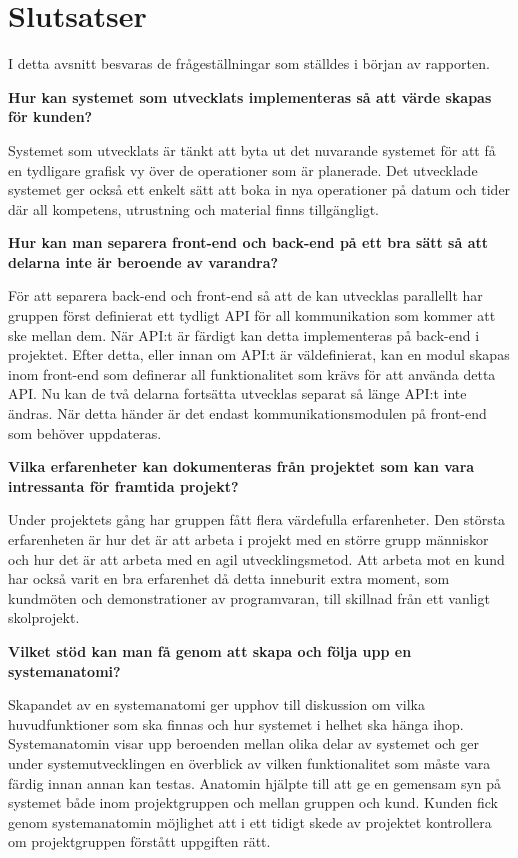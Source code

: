 \chapter{Slutsatser}
I detta avsnitt besvaras de frågeställningar som ställdes i början av rapporten.

\textbf{Hur kan systemet som utvecklats implementeras så att värde skapas för kunden?}

Systemet som utvecklats är tänkt att byta ut det nuvarande systemet för att få en tydligare grafisk vy över de operationer som är planerade. Det utvecklade systemet ger också ett enkelt sätt att boka in nya operationer på datum och tider där all kompetens, utrustning och material finns tillgängligt.

\textbf{Hur kan man separera front-end och back-end på ett bra sätt så att delarna inte är beroende av varandra?}

För att separera back-end och front-end så att de kan utvecklas parallellt har gruppen först definierat ett tydligt API för all kommunikation som kommer att ske mellan dem. När API:t är färdigt kan detta implementeras på back-end i projektet. Efter detta, eller innan om API:t är väldefinierat, kan en modul skapas inom front-end som definerar all funktionalitet som krävs för att använda detta API. Nu kan de två delarna fortsätta utvecklas separat så länge API:t inte ändras. När detta händer är det endast kommunikationsmodulen på front-end som behöver uppdateras.

\textbf{Vilka erfarenheter kan dokumenteras från projektet som kan vara intressanta för framtida projekt?}

Under projektets gång har gruppen fått flera värdefulla erfarenheter. Den största erfarenheten är hur det är att arbeta i projekt med en större grupp människor och hur det är att arbeta med en agil utvecklingsmetod. Att arbeta mot en kund har också varit en bra erfarenhet då detta inneburit extra moment, som kundmöten och demonstrationer av programvaran, till skillnad från ett vanligt skolprojekt.

\textbf{Vilket stöd kan man få genom att skapa och följa upp en systemanatomi?}

Skapandet av en systemanatomi ger upphov till diskussion om vilka huvudfunktioner som ska finnas och hur systemet i helhet ska hänga ihop. Systemanatomin visar upp beroenden mellan olika delar av systemet och ger under systemutvecklingen en överblick av vilken funktionalitet som måste vara färdig innan annan kan testas. Anatomin hjälpte till att ge en gemensam syn på systemet både inom projektgruppen och mellan gruppen och kund. Kunden fick genom systemanatomin möjlighet att i ett tidigt skede av projektet kontrollera om projektgruppen förstått uppgiften rätt.    
